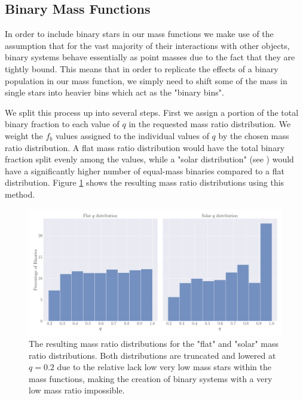 \subsection{Binary Mass Functions}

In order to include binary stars in our mass functions we make use of the assumption that for the
vast majority of their interactions with other objects, binary systems behave essentially as point
masses due to the fact that they are tightly bound. This means that in order to replicate the
effects of a binary population in our mass function, we simply need to shift some of the mass in
single stars into heavier bins which act as the "binary bins".


We split this process up into several steps. First we assign a portion of the total binary fraction
to each value of $q$ in the requested mass ratio distribution. We weight the $f_b$ values assigned
to the individual values of $q$ by the chosen mass ratio distribution. A flat mass ratio
distribution would have the total binary fraction split evenly among the values, while a "solar
distribution" (see \citealt{Reggiani2013}) would have a significantly higher number of equal-mass
binaries compared to a flat distribution. Figure \ref{fig:2/q-dists} shows the resulting mass ratio
distributions using this method.





\begin{figure}
    \centering
    \includegraphics[width=\textwidth]{figures/q-dists.png}
    \caption{The resulting mass ratio distributions for the "flat" and "solar" mass ratio
        distributions. Both distributions are truncated and lowered at $q=0.2$ due to the relative
        lack low very low mass stars within the mass functions, making the creation of binary
        systems with a very low mass ratio impossible.}
    \label{fig:2/q-dists}
\end{figure}


